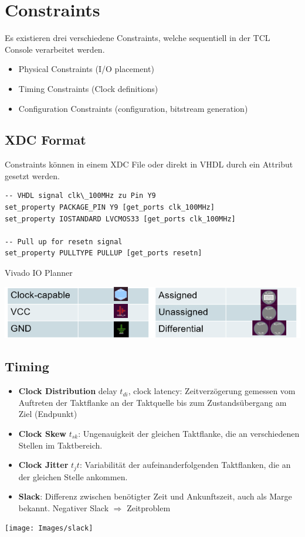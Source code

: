 \section{Constraints}
Es existieren drei verschiedene Constraints, welche sequentiell in der TCL Console verarbeitet werden.
\begin{itemize}[nosep]
	\item Physical Constraints (I/O placement)
	\item Timing Constraints (Clock definitions)
	\item Configuration Constraints (configuration, bitstream generation)
\end{itemize}

\subsection{XDC Format}
Constraints können in einem XDC File oder direkt in VHDL durch ein Attribut gesetzt werden.
\begin{lstlisting}
-- VHDL signal clk\_100MHz zu Pin Y9
set_property PACKAGE_PIN Y9 [get_ports clk_100MHz]
set_property IOSTANDARD LVCMOS33 [get_ports clk_100MHz]

-- Pull up for resetn signal
set_property PULLTYPE PULLUP [get_ports resetn]
\end{lstlisting}
\vspace{-20pt}

Vivado IO Planner
\begin{center}
	\includegraphics[width=0.8\columnwidth]{Images/ioplanner}
\end{center}

\subsection{Timing}
\begin{itemize}[nosep]
\item \textbf{Clock Distribution} delay $t_{di}$, clock latency: Zeitverzögerung gemessen vom Auftreten der Taktflanke an der Taktquelle bis zum Zustandsübergang am Ziel (Endpunkt)
\item \textbf{Clock Skew} $t_{sk}$: Ungenauigkeit der gleichen Taktflanke, die an verschiedenen Stellen im Taktbereich.
\item \textbf{Clock Jitter} $t_jt$: Variabilität der aufeinanderfolgenden Taktflanken, die an der gleichen Stelle ankommen.
\item \textbf{Slack}: Differenz zwischen benötigter Zeit und Ankunftszeit, auch als Marge bekannt. Negativer Slack $\Rightarrow$ Zeitproblem
\end{itemize}
\begin{center}
	\texttt{[image: Images/slack]}
\end{center}


